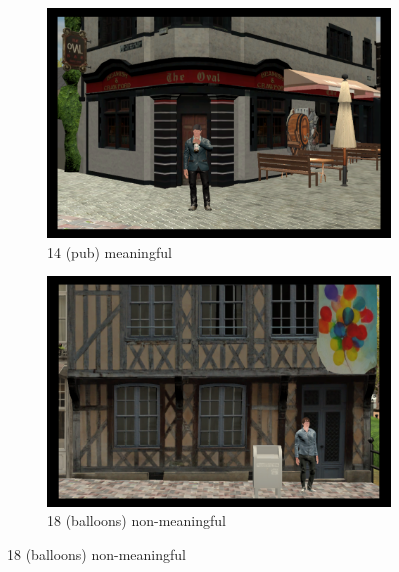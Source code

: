 \begin{figure}[!htb]
	\begin{subfigure}[b]{0.48\linewidth}
		\includegraphics[width=\linewidth]{figures/starting_locations_appx/14_S(pub)_A.PNG}
		\caption{14 (pub) meaningful}
		\label{fig:14_S(pub)_A}
	\end{subfigure}
	\begin{subfigure}[b]{0.48\linewidth}
		\includegraphics[width=\linewidth]{figures/starting_locations_appx/18_R(baloons)_A.PNG}
		\caption{18 (balloons) non-meaningful}
		\label{fig:18_R(baloons)_A}
	\end{subfigure}


\end{figure}
